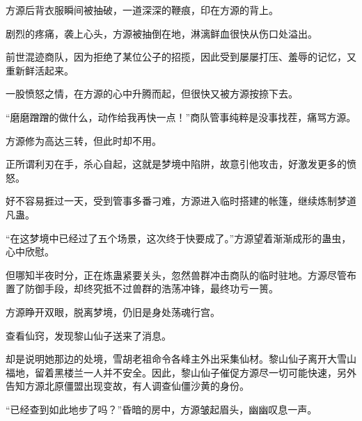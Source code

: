 \begin{this_body}
方源后背衣服瞬间被抽破，一道深深的鞭痕，印在方源的背上。

剧烈的疼痛，袭上心头，方源被抽倒在地，淋漓鲜血很快从伤口处溢出。

前世混迹商队，因为拒绝了某位公子的招揽，因此受到屡屡打压、羞辱的记忆，又重新鲜活起来。

一股愤怒之情，在方源的心中升腾而起，但很快又被方源按捺下去。

“磨磨蹭蹭的做什么，动作给我再快一点！”商队管事纯粹是没事找茬，痛骂方源。

方源修为高达三转，但此时却不用。

正所谓利刃在手，杀心自起，这就是梦境中陷阱，故意引他攻击，好激发更多的愤怒。

好不容易捱过一天，受到管事多番刁难，方源进入临时搭建的帐篷，继续炼制梦道凡蛊。

“在这梦境中已经过了五个场景，这次终于快要成了。”方源望着渐渐成形的蛊虫，心中欣慰。

但哪知半夜时分，正在炼蛊紧要关头，忽然兽群冲击商队的临时驻地。方源尽管布置了防御手段，却终究抵不过兽群的浩荡冲锋，最终功亏一篑。

方源睁开双眼，脱离梦境，仍旧是身处荡魂行宫。

查看仙窍，发现黎山仙子送来了消息。

却是说明她那边的处境，雪胡老祖命令各峰主外出采集仙材。黎山仙子离开大雪山福地，留着黑楼兰一人并不安全。因此，黎山仙子催促方源尽一切可能快速，另外告知方源北原僵盟出现变故，有人调查仙僵沙黄的身份。

“已经查到如此地步了吗？”昏暗的房中，方源皱起眉头，幽幽叹息一声。

\end{this_body}

